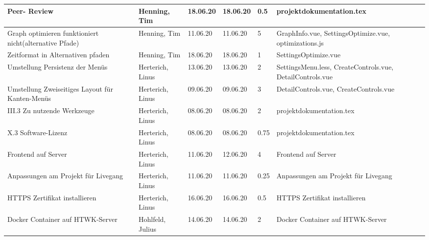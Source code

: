 \begin{longtable}{|p{4cm}|p{2cm}|p{1.2cm}|p{1.2cm}|p{0.7cm}|p{3.8cm}|}
      Peer- Review                                                           & Henning, Tim          & 18.06.20 & 18.06.20 & 0.5  & projektdokumentation.tex                                  \\ \hline
      Graph optimieren funktioniert nicht(alternative Pfade)                 & Henning, Tim          & 11.06.20 & 11.06.20 & 5    & GraphInfo.vue, SettingsOptimize.vue, optimizations.js     \\ \hline
      Zeitformat in Alternativen pfaden                                      & Henning, Tim          & 18.06.20 & 18.06.20 & 1    & SettingsOptimize.vue                                      \\ \hline
      Umstellung Persistenz der Menüs                                        & Herterich, Linus      & 13.06.20 & 13.06.20 & 2    & SettingsMenu.less, CreateControls.vue, DetailControls.vue \\ \hline
      Umstellung Zweiseitiges Layout für Kanten-Menüs                        & Herterich, Linus      & 09.06.20 & 09.06.20 & 3    & DetailControls.vue, CreateControls.vue                    \\ \hline
      III.3 Zu nutzende Werkzeuge                                            & Herterich, Linus      & 08.06.20 & 08.06.20 & 2    & projektdokumentation.tex                                  \\ \hline
      X.3 Software-Lizenz                                                    & Herterich, Linus      & 08.06.20 & 08.06.20 & 0.75 & projektdokumentation.tex                                  \\ \hline
      Frontend auf Server                                                    & Herterich, Linus      & 11.06.20 & 12.06.20 & 4    & Frontend auf Server                                       \\ \hline
      Anpassungen am Projekt für Livegang                                    & Herterich, Linus      & 11.06.20 & 11.06.20 & 0.25 & Anpassungen am Projekt für Livegang                       \\ \hline
      HTTPS Zertifikat installieren                                          & Herterich, Linus      & 16.06.20 & 16.06.20 & 0.5  & HTTPS Zertifikat installieren                             \\ \hline
      Docker Container auf HTWK-Server                                       & Hohlfeld, Julius      & 14.06.20 & 14.06.20 & 2    & Docker Container auf HTWK-Server                          \\ \hline

\end{longtable}

